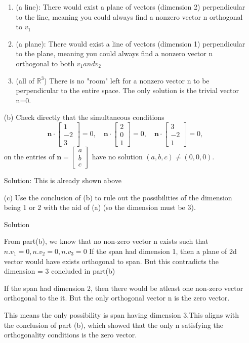 \begin{enumerate}
\begin{enumerate}
    \item (a line): There would exist a plane of vectors (dimension 2) perpendicular to the line, meaning you could always find a nonzero vector n orthogonal to $v_1$
    \item (a plane): There would exist a line of vectors (dimension 1) perpendicular to the plane, meaning you could always find a nonzero vector n orthogonal to both $v_1 and v_2$
    \item (all of $\mathbb{R}^3$) There is no "room" left for a nonzero vector n to be perpendicular to the entire space. The only solution is the trivial vector n=0.
\end{enumerate}




\item[(b)] Check directly that the simultaneous conditions
\[
\mathbf{n} \cdot 
\begin{bmatrix}
1 \\ -2 \\ 3
\end{bmatrix}
= 0, \quad
\mathbf{n} \cdot 
\begin{bmatrix}
2 \\ 0 \\ 1
\end{bmatrix}
= 0, \quad
\mathbf{n} \cdot 
\begin{bmatrix}
3 \\ -2 \\ 1
\end{bmatrix}
= 0,
\]
on the entries of $\mathbf{n} = 
\begin{bmatrix}
a \\ b \\ c
\end{bmatrix}$
have no solution $(a, b, c) \neq (0, 0, 0)$.

Solution: This is already shown above

\item[(c)] Use the conclusion of (b) to rule out the possibilities of the dimension being 1 or 2 with the aid of (a) (so the dimension must be 3).

Solution

From part(b), we know that no non-zero vector n exists such that $n.v_1=0, n.v_2=0, n.v_3=0$
If the span had dimension 1, then a plane of 2d vector would have exists orthogonal to span. But this contradicts the dimension = 3 concluded in part(b)

If the span had dimension 2, then there would be atleast one non-zero vector orthogonal to the it.
But the only orthogonal vector n is the zero vector.

This means the only possibility is span having dimension 3.This aligns with the conclusion of part (b), which showed that the only n satisfying the orthogonality conditions is the zero vector.

\end{enumerate}


